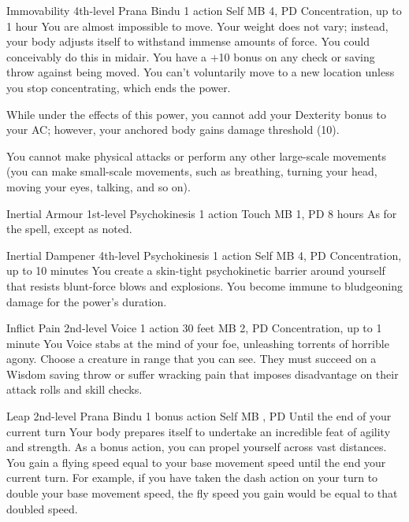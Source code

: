 \DndPowerHeader%
  {Immovability}
  {4th-level Prana Bindu}
  {1 action}
  {Self}
  {MB 4, PD \lvlfour}
  {Concentration, up to 1 hour}
  You are almost impossible to move.
  Your weight does not vary;
  instead, your body adjusts itself to withstand
  immense amounts of force.
  You could conceivably do this in midair.
  You have a +10 bonus on any check or saving throw
  against being moved.
  You can't voluntarily move to a new location
  unless you stop concentrating, which ends the power.

  While under the effects of this power,
  you cannot add your Dexterity bonus to your AC;
  however, your anchored body gains damage threshold (10).
  
  You cannot make physical attacks
  or perform any other large-scale movements
  (you can make small-scale movements,
  such as breathing,
  turning your head,
  moving your eyes,
  talking, and so on).

\DndPowerHeader%
  {Inertial Armour}
  {1st-level Psychokinesis}
  {1 action}
  {Touch}
  {MB 1, PD \lvlone}
  {8 hours}
As for the  spell, except as noted.

\DndPowerHeader%
  {Inertial Dampener}
  {4th-level Psychokinesis}
  {1 action}
  {Self}
  {MB 4, PD \lvlfour}
  {Concentration, up to 10 minutes}
  You create a skin-tight psychokinetic barrier around yourself
  that resists blunt-force blows and explosions.
  You become immune to bludgeoning damage for the power's duration.

\DndPowerHeader%
  {Inflict Pain}
  {2nd-level Voice}
  {1 action}
  {30 feet}
  {MB 2, PD \lvltwo}
  {Concentration, up to 1 minute}
  You Voice stabs at the mind of your foe,
  unleashing torrents of horrible agony.
  Choose a creature in range that you can see.
  They must succeed on a Wisdom saving throw or
  suffer wracking pain that imposes disadvantage on
  their attack rolls and skill checks.

\DndPowerHeader%
  {Leap}
  {2nd-level Prana Bindu}
  {1 bonus action}
  {Self}
  {MB , PD \lvltwo}
  {Until the end of your current turn}
Your body prepares itself to undertake an incredible feat
of agility and strength.
As a bonus action,
you can propel yourself across vast distances.
You gain a flying speed equal to your base movement speed
until the end your current turn.
For example,
if you have taken the dash action on your turn to double
your base movement speed,
the fly speed you gain would be equal to that doubled speed.
 
